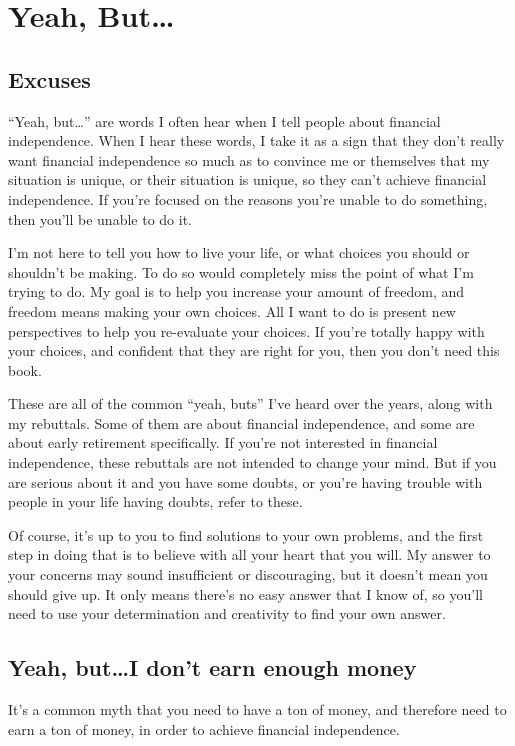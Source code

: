 \chapter{Yeah, But\ldots}

\section{Excuses}
``Yeah, but\ldots'' are words I often hear when I tell people about financial independence. When I hear these words, I take it as a sign that they don't really want financial independence so much as to convince me or themselves that my situation is unique, or their situation is unique, so they can't achieve financial independence. If you're focused on the reasons you're unable to do something, then you'll be unable to do it.

I'm not here to tell you how to live your life, or what choices you should or shouldn't be making. To do so would completely miss the point of what I'm trying to do. My goal is to help you increase your amount of freedom, and freedom means making your own choices. All I want to do is present new perspectives to help you re-evaluate your choices. If you're totally happy with your choices, and confident that they are right for you, then you don't need this book.

These are all of the common ``yeah, buts'' I've heard over the years, along with my rebuttals. Some of them are about financial independence, and some are about early retirement specifically. If you're not interested in financial independence, these rebuttals are not intended to change your mind. But if you are serious about it and you have some doubts, or you're having trouble with people in your life having doubts, refer to these.

Of course, it's up to you to find solutions to your own problems, and the first step in doing that is to believe with all your heart that you will. My answer to your concerns may sound insufficient or discouraging, but it doesn't mean you should give up. It only means there's no easy answer that I know of, so you'll need to use your determination and creativity to find your own answer.

\section{Yeah, but\ldots I don't earn enough money}
It's a common myth that you need to have a ton of money, and therefore need to earn a ton of money, in order to achieve financial independence.

